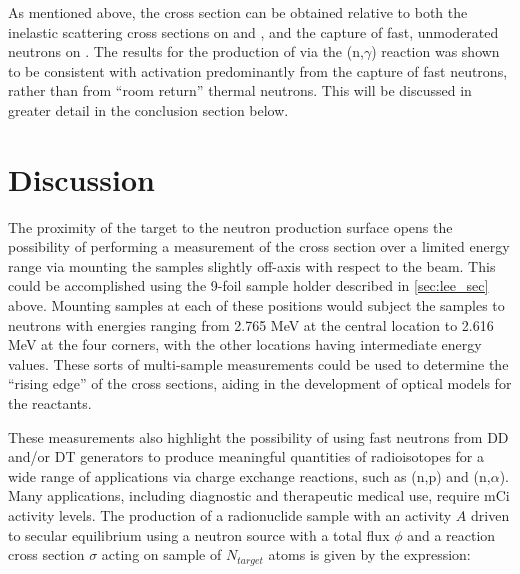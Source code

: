 \documentclass[5p]{elsarticle}
\newcommand{\comment}[1]{\todo[color=blue!20!white,inline]{ASV: #1}}
\begin{document}
As mentioned above, the cross section can be obtained relative to both the inelastic scattering cross sections on  and , and the capture of fast, unmoderated neutrons on .
The results for the production of  via the (n,$\gamma$) reaction was shown to be consistent with activation predominantly from the capture of fast neutrons, rather than from \enquote{room return} thermal neutrons.
 This will be discussed in greater detail in the conclusion section below.




 




          
\section{Discussion}




The proximity of the target to the neutron production surface opens the possibility of performing a measurement of the cross section over a limited energy range via mounting the samples slightly off-axis with respect to the beam.
 This could be accomplished using the 9-foil sample holder described in \autoref{sec:lee_sec} above.
 Mounting samples at each of these positions would subject the samples to neutrons with energies ranging from 2.765 MeV at the central location to 2.616 MeV at the four corners, with the other locations having intermediate energy values.
 These sorts of multi-sample measurements could be used to determine the \enquote{rising edge} of the cross sections, aiding in the development of optical models for the reactants.



These measurements also highlight the possibility of using fast neutrons from DD and/or DT generators to produce meaningful quantities of radioisotopes for a wide range of applications via charge exchange reactions, such as (n,p) and (n,$\alpha$).
 Many applications, including diagnostic and therapeutic medical use, require mCi activity levels.
 The production of a radionuclide sample with an activity $A$ driven to secular equilibrium using a neutron source with a total flux $\phi$ and a reaction cross section $\sigma$ acting on sample of $N_{target}$ atoms is given by the expression:
\end{document}
